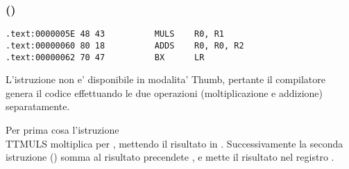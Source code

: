 \subsubsection{\OptimizingKeilVI (\ThumbMode)}

\begin{lstlisting}[label=ARM_leaf_example2,style=customasmARM]
.text:0000005E 48 43          MULS    R0, R1
.text:00000060 80 18          ADDS    R0, R0, R2
.text:00000062 70 47          BX      LR
\end{lstlisting}

L'istruzione  non e' disponibile in modalita' Thumb, pertante il compilatore genera il codice effettuando le due operazioni 
(moltiplicazione e addizione) separatamente.

Per prima cosa l'istruzione \\TT{MULS} moltiplica  per , mettendo il risultato in .
Successivamente la seconda istruzione () somma al risultato precendete , e mette il risultato nel registro .
